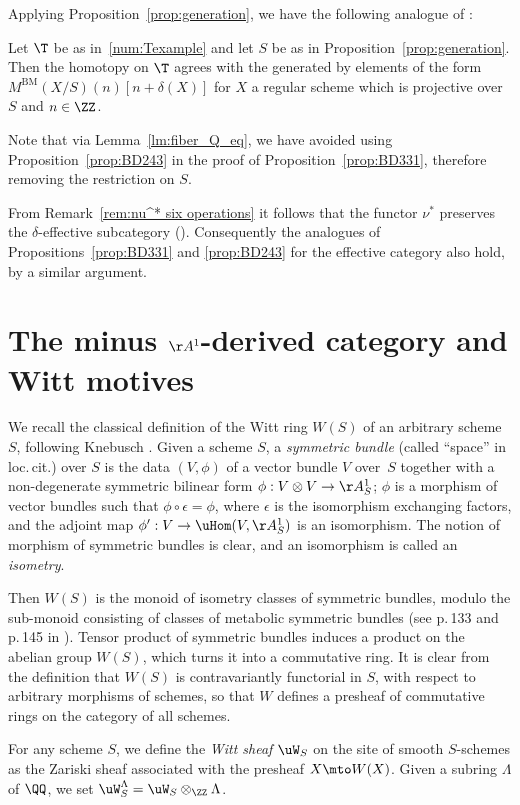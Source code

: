 \begin{num}
Applying Proposition~\ref{prop:generation}, we have the following analogue of \cite[Th.\,2.4.3]{BD1}:
\begin{prop}
\label{prop:BD243}
Let $\T$ be as in~\ref{num:Texample} and let $S$ be as in Proposition~\ref{prop:generation}. Then the homotopy \tstructure on $\T$ agrees with the \tstructure generated by elements of the form $M^{\mathrm{BM}}(X/S)(n)[n+\delta(X)]$ for $X$ a regular scheme which is projective over $S$ and $n\in\ZZ$.
\end{prop}
Note that via Lemma~\ref{lm:fiber_Q_eq}, we have avoided using Proposition~\ref{prop:BD243} in the proof of Proposition~\ref{prop:BD331}, therefore removing the restriction on $S$.
\end{num}

\begin{num}
\label{num:eff_cat}
From Remark~\ref{rem:nu^* six operations} it follows that the functor $\nu^*$ preserves the $\delta$-effective subcategory (\cite[Def.\,2.2.1]{BD1}). Consequently the analogues of Propositions~\ref{prop:BD331} and \ref{prop:BD243} for the effective category also hold, by a similar argument.
\end{num}

\section{The minus \texorpdfstring{$\AA^1$}{A1}-derived category and Witt motives}
\label{sec:W}

\begin{num}\label{num:symm_bdl}
We recall the classical definition of the Witt ring $W(S)$ of an arbitrary scheme~$S$,
following Knebusch \cite[I, \S 5]{Kne}.
Given a scheme $S$, a \emph{symmetric bundle} (called ``space'' in loc.\,cit.)
over $S$ is the data $(V,\phi)$ of a vector bundle $V$ over~$S$
together with a non-degenerate symmetric bilinear form $\phi:V \otimes V \to \AA^1_S$;
\ie $\phi$ is a morphism of vector bundles such that $\phi \circ \epsilon=\phi$, where $\epsilon$ is the
isomorphism exchanging factors, and the adjoint map $\phi':V \to \uHom(V,\AA^1_S)$ is an isomorphism.
The notion of morphism of symmetric bundles is clear, and an isomorphism is called an \emph{isometry}.

Then $W(S)$ is the monoid of isometry classes of symmetric bundles, modulo the sub-monoid consisting of classes of metabolic symmetric bundles (see p.\,133 and p.\,145 in \cite{Kne}). Tensor product of symmetric bundles induces a product on the abelian group $W(S)$, which turns it into a commutative ring.
It is clear from the definition that $W(S)$ is contravariantly functorial in $S$, with respect to arbitrary morphisms of schemes, so that $W$ defines a presheaf of commutative rings on the category of all schemes.
\end{num}
\begin{df}\label{df:unramified_Witt}
For any scheme $S$, we define the \emph{Witt sheaf} $\uW_S$ on the site of smooth $S$-schemes as the Zariski sheaf associated with the presheaf $X \mto W(X)$.
Given a subring $\Lambda$ of $\QQ$, we set $\uW_S^\Lambda=\uW_S \otimes_\ZZ \Lambda$.
\end{df}

